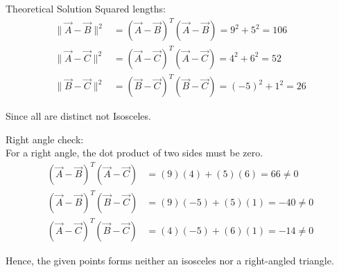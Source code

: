 \documentclass{beamer}
\begin{document}
\begin{frame}{Theoretical Solution}
Squared lengths:
\begin{align}
\|\vec{A}-\vec{B}\|^2 &= (\vec{A}-\vec{B})^T(\vec{A}-\vec{B})
= 9^2 + 5^2 = 106 \\
\|\vec{A}-\vec{C}\|^2 &= (\vec{A}-\vec{C})^T(\vec{A}-\vec{C})
= 4^2 + 6^2 = 52 \\
\|\vec{B}-\vec{C}\|^2 &= (\vec{B}-\vec{C})^T(\vec{B}-\vec{C})
= (-5)^2 + 1^2 = 26
\end{align}
\begin{center}
                    Since all are distinct not Isosceles.\\
\end{center}

Right angle check:\\

For a right angle, the dot product of two sides must be zero.
\begin{align}
(\vec{A}-\vec{B})^T(\vec{A}-\vec{C}) &= (9)(4) + (5)(6) = 66 \neq 0 \\
(\vec{A}-\vec{B})^T(\vec{B}-\vec{C}) &= (9)(-5) + (5)(1) = -40 \neq 0 \\
(\vec{A}-\vec{C})^T(\vec{B}-\vec{C}) &= (4)(-5) + (6)(1) = -14 \neq 0
\end{align}

Hence, the given points forms neither an isosceles nor a right-angled triangle.
\end{frame}
\end{document}
